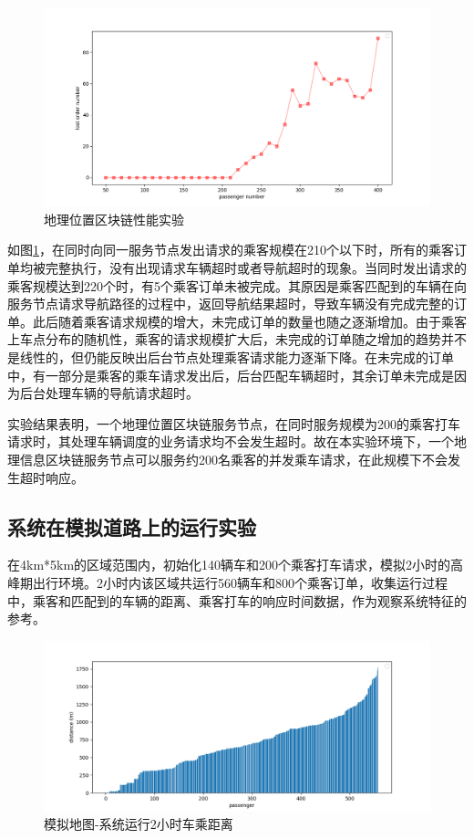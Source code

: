 \begin{figure}[h]
  \centering
  \includegraphics[width=1.0\textwidth]{figures/地理位置区块链性能实验}
  \caption{地理位置区块链性能实验}\label{fig:treeBlockchcainPerformance}
\end{figure}

如图\ref{fig:treeBlockchcainPerformance}，在同时向同一服务节点发出请求的乘客规模在210个以下时，所有的乘客订单均被完整执行，没有出现请求车辆超时或者导航超时的现象。当同时发出请求的乘客规模达到220个时，有5个乘客订单未被完成。其原因是乘客匹配到的车辆在向服务节点请求导航路径的过程中，返回导航结果超时，导致车辆没有完成完整的订单。此后随着乘客请求规模的增大，未完成订单的数量也随之逐渐增加。由于乘客上车点分布的随机性，乘客的请求规模扩大后，未完成的订单随之增加的趋势并不是线性的，但仍能反映出后台节点处理乘客请求能力逐渐下降。在未完成的订单中，有一部分是乘客的乘车请求发出后，后台匹配车辆超时，其余订单未完成是因为后台处理车辆的导航请求超时。

实验结果表明，一个地理位置区块链服务节点，在同时服务规模为200的乘客打车请求时，其处理车辆调度的业务请求均不会发生超时。故在本实验环境下，一个地理信息区块链服务节点可以服务约200名乘客的并发乘车请求，在此规模下不会发生超时响应。

\subsection{系统在模拟道路上的运行实验}
在4km*5km的区域范围内，初始化140辆车和200个乘客打车请求，模拟2小时的高峰期出行环境。2小时内该区域共运行560辆车和800个乘客订单，收集运行过程中，乘客和匹配到的车辆的距离、乘客打车的响应时间数据，作为观察系统特征的参考。

\begin{figure}[h]
  \centering
  \includegraphics[width=1.0\textwidth]{figures/2hDistance}
  \caption{模拟地图-系统运行2小时车乘距离}\label{fig:2hDistance}
\end{figure}

